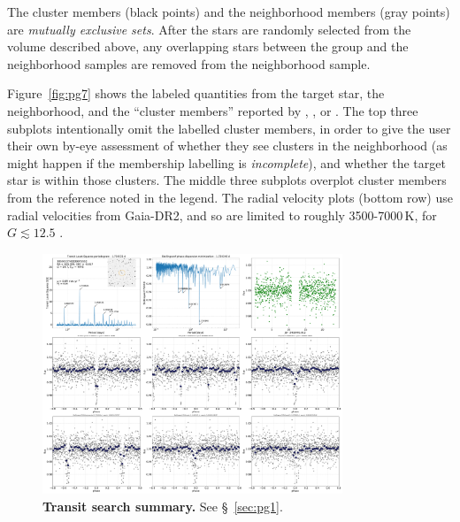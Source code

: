 \documentclass[12pt,twocolumn,tighten]{aastex62}
\begin{document}
The cluster members (black points) and the neighborhood members (gray
points) are {\it mutually exclusive sets}. After the stars are
randomly selected from the volume described above, any overlapping
stars between the group and the neighborhood samples are removed from
the neighborhood sample.

Figure~\ref{fig:pg7} shows the labeled quantities from the target
star, the neighborhood, and the ``cluster members'' reported by
\citet{cantat-gaudin_gaia_2018}, \cite{kounkel_untangling_2019}, or
\citet{Kharchenko_et_al_2013}.  The top three subplots intentionally
omit the labelled cluster members, in order to give the user their own
by-eye assessment of whether they see clusters in the neighborhood (as
might happen if the membership labelling is {\it incomplete}),
and whether the target star is within those clusters.
The middle three subplots overplot cluster members from the reference
noted in the legend.
The radial velocity plots (bottom row) use radial velocities from Gaia-DR2,
and so are limited to roughly 3500-7000$\,$K, for $G\lesssim 12.5$ \citep{katz_gaia_2019}.

\begin{figure}[!h]
	\begin{center}
		\leavevmode
		\includegraphics[width=0.8\textwidth]{pg_0001.pdf}
	\end{center}
	\vspace{-0.5cm}
	\caption{
    {\bf Transit search summary.} See \S~\ref{sec:pg1}.
		\label{fig:pg1}
	}
\end{figure}
\end{document}
